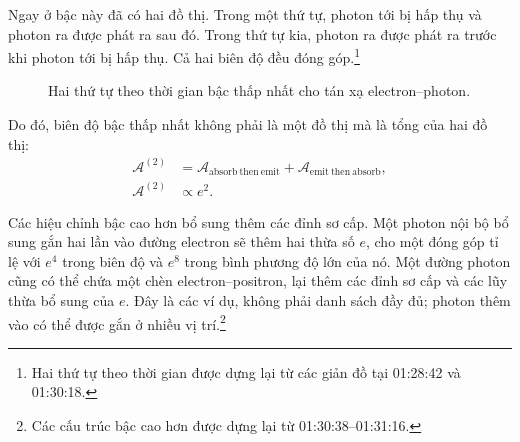Ngay ở bậc này đã có hai đồ thị. Trong một thứ tự, photon tới bị hấp thụ và photon ra được phát ra sau đó. Trong thứ tự kia, photon ra được phát ra trước khi photon tới bị hấp thụ. Cả hai biên độ đều đóng góp.\footnote{Hai thứ tự theo thời gian được dựng lại từ các giản đồ tại 01:28:42 và 01:30:18.}

\begin{figure}[htbp]
\centering
{}
\caption{Hai thứ tự theo thời gian bậc thấp nhất cho tán xạ electron--photon.}
\end{figure}

Do đó, biên độ bậc thấp nhất không phải là một đồ thị mà là tổng của hai đồ thị:
\begin{equation}
\begin{aligned}
\mathcal{A}^{(2)}
&=
\mathcal{A}_{\mathrm{absorb\ then\ emit}}
+\mathcal{A}_{\mathrm{emit\ then\ absorb}},\\
\mathcal{A}^{(2)}&\propto e^2.
\end{aligned}
\end{equation}

Các hiệu chỉnh bậc cao hơn bổ sung thêm các đỉnh sơ cấp. Một photon nội bộ bổ sung gắn hai lần vào đường electron sẽ thêm hai thừa số \(e\), cho một đóng góp tỉ lệ với \(e^4\) trong biên độ và \(e^8\) trong bình phương độ lớn của nó. Một đường photon cũng có thể chứa một chèn electron--positron, lại thêm các đỉnh sơ cấp và các lũy thừa bổ sung của \(e\). Đây là các ví dụ, không phải danh sách đầy đủ; photon thêm vào có thể được gắn ở nhiều vị trí.\footnote{Các cấu trúc bậc cao hơn được dựng lại từ 01:30:38--01:31:16.}

